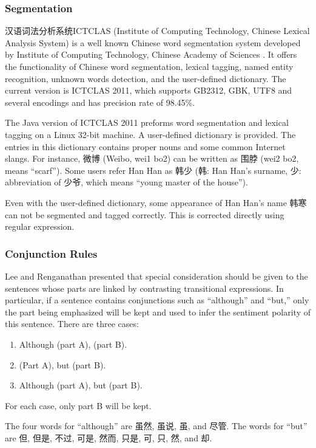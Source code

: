 \documentclass[11pt]{article}
\newcommand{\1}[1]{{\mathbf 1}\left\{#1\right\}}        %
\begin{document}
	

\subsubsection{Segmentation}

汉语词法分析系统ICTCLAS (Institute of Computing Technology, Chinese Lexical Analysis System) is a well known Chinese word segmentation system developed by Institute of Computing Technology, Chinese Academy of Sciences \cite{ICTCLAS}. It offers the functionality of  Chinese word segmentation, lexical tagging, named entity recognition, unknown words detection, and the user-defined dictionary. 
The current version is ICTCLAS 2011, which supports GB2312, GBK, UTF8 and several encodings and has precision rate of 98.45\%. 

The Java version of ICTCLAS 2011 preforms word segmentation and lexical tagging on a Linux 32-bit machine. A user-defined dictionary is provided. The entries in this dictionary contains proper nouns and some common Internet slangs. For instance, 微博 (Weibo, wei1 bo2) can be written as 围脖 (wei2 bo2, means ``scarf''). Some users refer Han Han as 韩少 (韩: Han Han's surname, 少: abbreviation of 少爷, which means ``young master of the house''). 

Even with the user-defined dictionary, some appearance of Han Han's name 韩寒 can not be segmented and tagged correctly. This is corrected directly using regular expression.

\subsubsection{Conjunction Rules}

Lee and Renganathan \cite{lee2011chinese} presented that special consideration should be given to the sentences whose parts are linked by contrasting transitional expressions. In particular, if a sentence contains conjunctions such as ``although'' and  ``but,'' only the part being emphasized will be kept and used to infer the sentiment polarity of this sentence. There are three cases:
\begin{enumerate}
\item Although (part A), (part B).
\item (Part A), but (part B).
\item Although (part A), but (part B).
\end{enumerate}
For each case, only part B will be kept. 

The four words for ``although'' are 虽然, 虽说, 虽, and 尽管. The words for ``but'' are 但, 但是, 不过, 可是, 然而, 只是, 可, 只, 然, and 却. 
\end{document}
